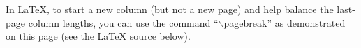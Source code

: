 \documentclass{article}
\begin{document}
In LaTeX, to start a new column (but not a new page) and help balance the
last-page column lengths, you can use the command ``$\backslash$pagebreak'' as
demonstrated on this page (see the LaTeX source below).

%






\end{document}
